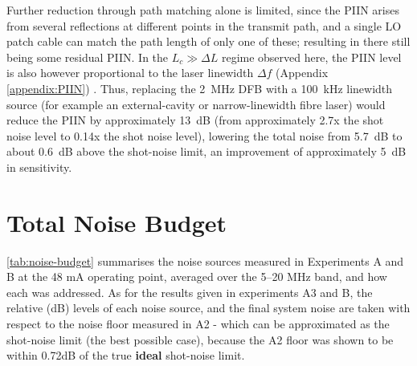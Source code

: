 Further reduction through path matching alone is limited, since the PIIN
arises from several reflections at different points in the transmit path,
and a single LO patch cable can match the path length of only one of these; resulting in there still being some residual PIIN. In the $L_c \gg \Delta L$ regime observed
here, the PIIN level is also however proportional to the laser linewidth $\Delta f$
(Appendix \ref{appendix:PIIN}) \cite{harris_role_1998}. Thus, replacing the
\SI{2}{MHz} DFB with a \SI{100}{kHz} linewidth source (for example an external-cavity
or narrow-linewidth fibre laser) would reduce the PIIN by approximately \SI{13}{dB} (from approximately 2.7x the shot noise level to 0.14x the shot noise level), lowering the total
noise from \SI{5.7}{dB} to about \SI{0.6}{dB} above the shot-noise limit,
an improvement of approximately \SI{5}{dB} in sensitivity.

\section{Total Noise Budget}
\label{sec:noise-budget}

\autoref{tab:noise-budget} summarises the noise sources measured in Experiments A
and B at the 48 mA operating point, averaged over the 5--20 MHz band, and how each was addressed. As for the results given in experiments A3 and B, the relative (dB) levels of each noise source, and the final system noise are taken with respect to the noise floor measured in A2 - which can be approximated as the shot-noise limit (the best possible case), because the A2 floor was shown to be within 0.72dB of the true \textbf{ideal} shot-noise limit.

